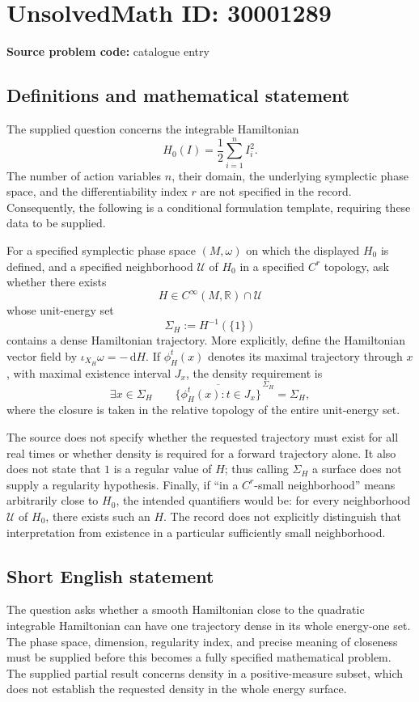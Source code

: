 \documentclass[11pt]{article}
\newcommand{\R}{\mathbb{R}}
\newcommand{\dd}{\,\mathrm{d}}
\begin{document}
\section*{UnsolvedMath ID: 30001289}
\textbf{Source problem code:} catalogue entry
\subsection{Definitions and mathematical statement}
The supplied question concerns the integrable Hamiltonian
\[
H_0(I)=\frac12\sum_{i=1}^{n}I_i^2.
\]
The number of action variables \(n\), their domain, the underlying symplectic phase space, and the differentiability index \(r\) are not specified in the record. Consequently, the following is a conditional formulation template, requiring these data to be supplied.

For a specified symplectic phase space \((M,\omega)\) on which the displayed \(H_0\) is defined, and a specified neighborhood \(\mathcal U\) of \(H_0\) in a specified \(C^r\) topology, ask whether there exists
\[
H\in C^\infty(M,\R)\cap\mathcal U
\]
whose unit-energy set
\[
\Sigma_H:=H^{-1}(\{1\})
\]
contains a dense Hamiltonian trajectory. More explicitly, define the Hamiltonian vector field by \(\iota_{X_H}\omega=-\dd H\). If \(\phi_H^t(x)\) denotes its maximal trajectory through \(x\), with maximal existence interval \(J_x\), the density requirement is
\[
\exists x\in\Sigma_H\qquad
\overline{\{\phi_H^t(x):t\in J_x\}}^{\,\Sigma_H}=\Sigma_H,
\]
where the closure is taken in the relative topology of the entire unit-energy set.

The source does not specify whether the requested trajectory must exist for all real times or whether density is required for a forward trajectory alone. It also does not state that \(1\) is a regular value of \(H\); thus calling \(\Sigma_H\) a surface does not supply a regularity hypothesis. Finally, if ``in a \(C^r\)-small neighborhood'' means arbitrarily close to \(H_0\), the intended quantifiers would be: for every neighborhood \(\mathcal U\) of \(H_0\), there exists such an \(H\). The record does not explicitly distinguish that interpretation from existence in a particular sufficiently small neighborhood.
\subsection{Short English statement}
The question asks whether a smooth Hamiltonian close to the quadratic integrable Hamiltonian can have one trajectory dense in its whole energy-one set. The phase space, dimension, regularity index, and precise meaning of closeness must be supplied before this becomes a fully specified mathematical problem. The supplied partial result concerns density in a positive-measure subset, which does not establish the requested density in the whole energy surface.
\end{document}
